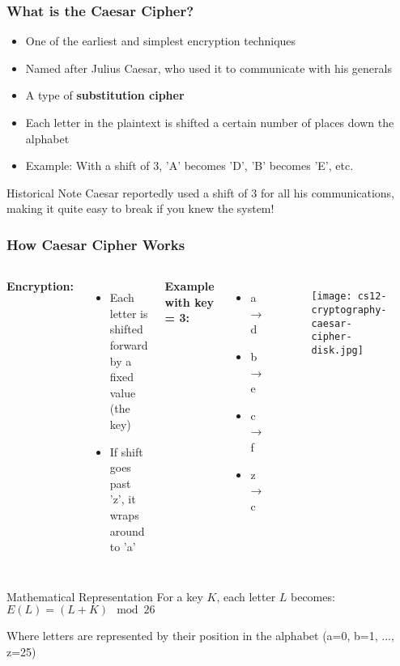 \documentclass{beamer}
\begin{document}
\begin{frame}
    \frametitle{What is the Caesar Cipher?}
    \begin{itemize}
        \item One of the earliest and simplest encryption techniques
        \item Named after Julius Caesar, who used it to communicate with his generals
        \item A type of \textbf{substitution cipher}
        \item Each letter in the plaintext is shifted a certain number of places down the alphabet
        \item Example: With a shift of 3, 'A' becomes 'D', 'B' becomes 'E', etc.
    \end{itemize}
    
    \begin{alertblock}{Historical Note}
        Caesar reportedly used a shift of 3 for all his communications, making it quite easy to break if you knew the system!
    \end{alertblock}
\end{frame}

\begin{frame}
    \frametitle{How Caesar Cipher Works}
    \begin{columns}
    \textbf{Encryption:}
    \begin{itemize}
        \item Each letter is shifted forward by a fixed value (the key)
        \item If shift goes past 'z', it wraps around to 'a'
    \end{itemize}
    
    \textbf{Example with key = 3:}
    \begin{itemize}
        \item a → d
        \item b → e
        \item c → f
        \item z → c
    \end{itemize}
    
    \begin{figure}
        \centering
        \texttt{[image: cs12-cryptography-caesar-cipher-disk.jpg]}
    \end{figure}
    \end{columns}
    
    \begin{block}{Mathematical Representation}
        For a key $K$, each letter $L$ becomes:
        $E(L) = (L + K) \mod 26$
        
        Where letters are represented by their position in the alphabet (a=0, b=1, ..., z=25)
    \end{block}
\end{frame}
\end{document}
